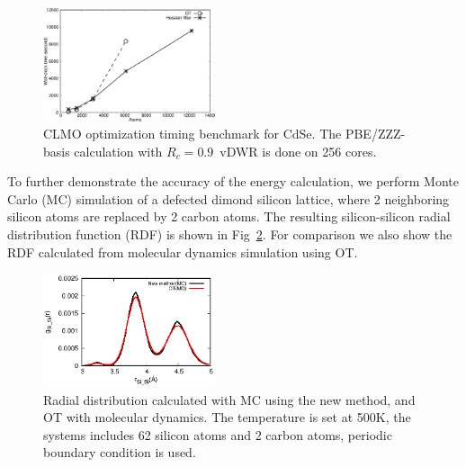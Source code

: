 \documentclass[aps,prl,twocolumn,reprint,amsmath,amssymb]{revtex4-1}
\begin{document}
\begin{figure}
\centering
\includegraphics[width=0.45\textwidth]{timing}
\caption{CLMO optimization timing benchmark for CdSe. The PBE/ZZZ-basis calculation with $R_c=0.9$~vDWR is done on 256 cores.}
\label{fig:scaling}
\end{figure}




To further demonstrate the accuracy of the energy calculation, we perform Monte Carlo (MC) simulation of a defected dimond silicon lattice, where 2 neighboring silicon atoms are replaced by 2 carbon atoms. The resulting silicon-silicon radial distribution function (RDF) is shown in Fig~\ref{fig:mc}. For comparison we also show the RDF calculated from molecular dynamics simulation using OT. 

\begin{figure}
\centering
\includegraphics[width=0.45\textwidth]{rdf_si}
\caption{Radial distribution calculated with MC using the new method, and OT with molecular dynamics. The temperature is set at 500K, the systems includes 62 silicon atoms and 2 carbon atoms, periodic boundary condition is used.}
\label{fig:mc}
\end{figure}
\end{document}
